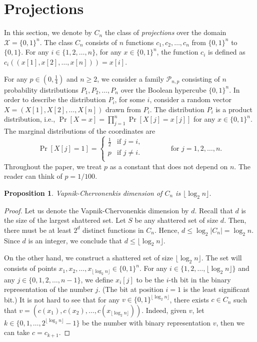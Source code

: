 \documentclass[10pt]{article}
\newtheorem{proposition}{Proposition}
\renewcommand{\P}{\mathcal{P}}
\newcommand{\X}{\mathcal{X}}
\begin{document}
\section{Projections}

In this section, we denote by $C_n$ the class of \emph{projections} over the
domain $\X = \{0,1\}^n$. The class $C_n$ consists of $n$ functions $c_1, c_2,
\dots, c_n$ from $\{0,1\}^n$ to $\{0,1\}$. For any $i \in \{1,2,\dots,n\}$, for
any $x \in \{0,1\}^n$, the function $c_i$ is defined as $c_i((x[1], x[2], \dots,
x[n])) = x[i]$.

For any $p \in (0,\frac{1}{4})$ and $n \ge 2$, we consider a family $\P_{n,p}$
consisting of $n$ probability distributions $P_1, P_2, \dots, P_n$ over the
Boolean hypercube $\{0,1\}^n$. In order to describe the distribution $P_i$, for
some $i$, consider a random vector $X = (X[1], X[2], \dots, X[n])$ drawn from
$P_i$. The distribution $P_i$ is a product distribution, i.e., $\Pr[X = x] =
\prod_{j=1}^n \Pr[X[j] = x[j]]$ for any $x \in \{0,1\}^n$. The marginal
distributions of the coordinates are
$$
\Pr[X[j] = 1] =
\begin{cases}
\frac{1}{2} & \text{if $j = i$,} \\
p & \text{if $j\neq i$.} \\
\end{cases}
\qquad \qquad \text{for $j=1,2,\dots,n$.}
$$
Throughout the paper, we treat $p$ as a constant that does not depend
on $n$. The reader can think of $p=1/100$.

\begin{proposition}
\label{proposition:vc-dimension-projections}
Vapnik-Chervonenkis dimension of $C_n$ is $\lfloor \log_2 n \rfloor$.
\end{proposition}

\begin{proof}
Let us denote the Vapnik-Chervonenkis dimension by $d$. Recall that $d$ is the
size of the largest shattered set. Let $S$ be any shattered set of size $d$.
Then, there must be at least $2^d$ distinct functions in $C_n$. Hence, $d \le
\log_2 |C_n| = \log_2 n$. Since $d$ is an integer, we conclude that $d \le
\lfloor \log_2 n \rfloor$.

On the other hand, we construct a shattered set of size $\lfloor \log_2 n
\rfloor$. The set will consists of points $x_1, x_2, \dots, x_{\lfloor \log_2 n
\rfloor} \in \{0,1\}^n$. For any $i \in \{1,2,\dots,\lfloor \log_2 n \rfloor\}$
and any $j \in \{0,1,2,\dots,n-1\}$, we define $x_i[j]$ to be the $i$-th bit
in the binary representation of the number $j$. (The bit at position $i=1$ is the
least significant bit.) It is not hard to see that for any $v \in
\{0,1\}^{\lfloor \log_2 n \rfloor}$, there exists $c \in C_n$ such that $v =
(c(x_1), c(x_2), \dots, c(x_{\lfloor \log_2 n \rfloor}))$. Indeed, given $v$,
let $k \in \{0,1,\dots,2^{\lfloor \log_2 n \rfloor} - 1\}$ be the number with
binary representation $v$, then we can take $c = c_{k+1}$.
\end{proof}
\end{document}
